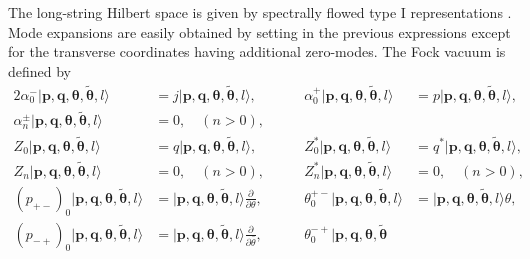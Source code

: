 \documentclass[a4paper,seceq,preprint]{ptptex}
\begin{document}
The long-string Hilbert space is given
by spectrally flowed type I representations 
\coordHE{}.\cite{KK} Mode expansions are 
easily obtained by setting \coordHE{} in the previous 
expressions except for the transverse coordinates 
\coordHE{} 
having additional zero-modes. 
The Fock vacuum is defined by
 \begin{alignat}{2}
   \alpha^-_0|\boldsymbol p,\boldsymbol q,\boldsymbol\theta,
\boldsymbol{\tilde\theta},l\rangle&=
j|\boldsymbol p,\boldsymbol q,\boldsymbol\theta,\boldsymbol{\tilde\theta}
,l\rangle,&\qquad
 \alpha^+_0|\boldsymbol p,\boldsymbol q,\boldsymbol\theta,
\boldsymbol{\tilde\theta},l\rangle&=p|\boldsymbol p,
\boldsymbol q,\boldsymbol\theta,\boldsymbol{\tilde\theta},l\rangle,
\nonumber\\
 \alpha^\pm_n|\boldsymbol p,\boldsymbol q,
\boldsymbol\theta,\boldsymbol{\tilde\theta}
,l\rangle&=0,\quad (n>0),&&\nonumber\\
 Z_0|\boldsymbol p,\boldsymbol q,
\boldsymbol\theta,\boldsymbol{\tilde\theta}
,l\rangle&=q|\boldsymbol p,\boldsymbol q,
\boldsymbol\theta,\boldsymbol{\tilde\theta},l\rangle,&\qquad
 Z^*_0|\boldsymbol p,\boldsymbol q,
\boldsymbol\theta,\boldsymbol{\tilde\theta}
,l\rangle&=q^*|\boldsymbol p,
\boldsymbol q,\boldsymbol\theta,\boldsymbol{\tilde\theta},l\rangle,
\nonumber\\
 Z_n|\boldsymbol p,\boldsymbol q,
\boldsymbol\theta,\boldsymbol{\tilde\theta}
,l\rangle&=0,\quad (n>0),&\qquad
 Z^*_n|\boldsymbol p,\boldsymbol q,
\boldsymbol\theta,\boldsymbol{\tilde\theta},l\rangle&=0,\quad (n>0),
\nonumber\\
 (p_{+-})_0|\boldsymbol p,\boldsymbol q,
\boldsymbol\theta,\boldsymbol{\tilde\theta},l\rangle&=
|\boldsymbol p,\boldsymbol q,
\boldsymbol\theta,\boldsymbol{\tilde\theta}
,l\rangle\frac{\partial}{\partial\theta},&\qquad
 \theta^{+-}_0|\boldsymbol p,\boldsymbol q,
\boldsymbol\theta,\boldsymbol{\tilde\theta}
,l\rangle&=|\boldsymbol p,\boldsymbol q,
\boldsymbol\theta,\boldsymbol{\tilde\theta},l\rangle\theta,
\nonumber\\
 (p_{-+})_0|\boldsymbol p,\boldsymbol q,
\boldsymbol\theta,\boldsymbol{\tilde\theta},l\rangle&=
|\boldsymbol p,\boldsymbol q,
\boldsymbol\theta,\boldsymbol{\tilde\theta}
,l\rangle\frac{\partial}{\partial\bar\theta},&\qquad
 \theta^{-+}_0|\boldsymbol p,\boldsymbol q,
\boldsymbol\theta,\boldsymbol{\tilde\theta}

\end{alignat}
\end{document}
